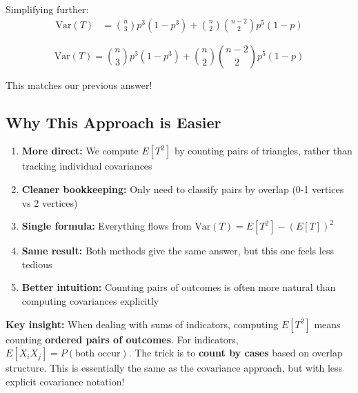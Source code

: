 \documentclass[11pt]{article}
\begin{document}
Simplifying further:
\begin{align*}
\text{Var}(T) &= \binom{n}{3} p^3(1-p^3) + \binom{n}{2}\binom{n-2}{2} p^5(1-p)
\end{align*}

\[
\boxed{\text{Var}(T) = \binom{n}{3} p^3(1-p^3) + \binom{n}{2}\binom{n-2}{2} p^5(1-p)}
\]

This matches our previous answer!

\subsection*{Why This Approach is Easier}

\begin{enumerate}[leftmargin=2em]
    \item \textbf{More direct:} We compute $E[T^2]$ by counting pairs of triangles, rather than tracking individual covariances

    \item \textbf{Cleaner bookkeeping:} Only need to classify pairs by overlap (0-1 vertices vs 2 vertices)

    \item \textbf{Single formula:} Everything flows from $\text{Var}(T) = E[T^2] - (E[T])^2$

    \item \textbf{Same result:} Both methods give the same answer, but this one feels less tedious

    \item \textbf{Better intuition:} Counting pairs of outcomes is often more natural than computing covariances explicitly
\end{enumerate}

\textbf{Key insight:} When dealing with sums of indicators, computing $E[T^2]$ means counting \textbf{ordered pairs of outcomes}. For indicators, $E[X_i X_j] = P(\text{both occur})$. The trick is to \textbf{count by cases} based on overlap structure. This is essentially the same as the covariance approach, but with less explicit covariance notation!
\end{document}
